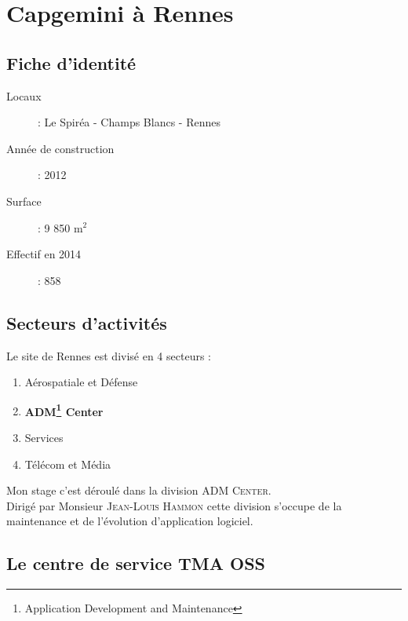 \chapter{Capgemini à Rennes}
\section{Fiche d'identité}
\begin{description}
  \item[Locaux] : Le Spiréa - Champs Blancs - Rennes
  \item[Année de construction] : 2012
  \item[Surface] : 9 850 m$^2$
  \item[Effectif en 2014] : 858
\end{description}
\begin{figure}[h]
\end{figure}
\newpage
\section{Secteurs d'activités}
Le site de Rennes est divisé en 4 secteurs :
\begin{enumerate}
\item Aérospatiale et Défense
\item \textbf{ADM\footnote{Application Development and Maintenance} Center}
\item Services
\item Télécom et Média\\
\end{enumerate}

Mon stage c'est déroulé dans la division \textsc{ADM Center}.\\
Dirigé par Monsieur \textsc{Jean-Louis Hammon}
cette division s'occupe de la maintenance et de l'évolution d'application logiciel.
\section{Le centre de service TMA OSS}

